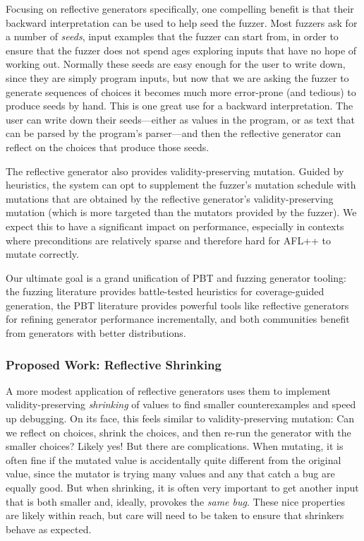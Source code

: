 Focusing on reflective generators specifically, one compelling benefit is that
their backward interpretation can be used to help seed the fuzzer.  Most fuzzers
ask for a number of {\em seeds}, input examples that the fuzzer can start from,
in order to ensure that the fuzzer does not spend ages exploring
inputs that have no hope of working out. Normally these seeds are easy enough
for the user to write down, since they are simply program inputs, but now that
we are asking the fuzzer to generate sequences of choices it becomes much more
error-prone (and tedious) to produce seeds by hand.  This is one great use for a
backward interpretation. The user can write down their seeds---either as values
in the program, or as text that can be parsed by the program's parser---and then
the reflective generator can reflect on the choices that produce those seeds.

The reflective generator also provides validity-preserving mutation. Guided by
heuristics, the system can opt to supplement the fuzzer's mutation schedule with
mutations that are obtained by the reflective generator's validity-preserving
mutation (which is more targeted than the mutators provided by the fuzzer). We
expect this to have a significant impact on performance, especially in contexts
where preconditions are relatively sparse and therefore hard for AFL++ to mutate
correctly.

Our ultimate goal is a grand unification of PBT and fuzzing generator tooling:
the fuzzing literature provides battle-tested heuristics for coverage-guided
generation, the PBT literature provides powerful tools like reflective
generators for refining generator performance incrementally, and both
communities benefit from generators with better distributions.

\subsubsection{Proposed Work: Reflective Shrinking}
A more modest application of reflective generators uses them to implement
validity-preserving {\em shrinking} of values to find smaller counterexamples
and speed up debugging. On its face, this feels similar to validity-preserving
mutation: Can we reflect on choices, shrink the choices, and then re-run the
generator with the smaller choices? Likely yes! But there are complications.
When mutating, it is often fine if the mutated value is accidentally quite
different from the original value, since the mutator is trying many values and
any that catch a bug are equally good. But when shrinking, it is often very
important to get another input that is both smaller and, ideally, provokes the
{\em same bug}. These nice properties are likely within reach, but care will
need to be taken to ensure that shrinkers behave as expected.

